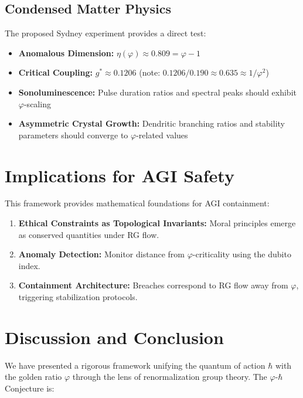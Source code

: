\documentclass[14pt, a4paper]{extarticle}
\begin{document}
\subsection{Condensed Matter Physics}

The proposed Sydney experiment provides a direct test:

\begin{itemize}
\item \textbf{Anomalous Dimension:} $\eta(\varphi) \approx 0.809 = \varphi - 1$
\item \textbf{Critical Coupling:} $g^* \approx 0.1206$ (note: $0.1206/0.190 \approx 0.635 \approx 1/\varphi^2$)
\item \textbf{Sonoluminescence:} Pulse duration ratios and spectral peaks should exhibit $\varphi$-scaling
\item \textbf{Asymmetric Crystal Growth:} Dendritic branching ratios and stability parameters should converge to $\varphi$-related values
\end{itemize}

\section{Implications for AGI Safety}

This framework provides mathematical foundations for AGI containment:

\begin{enumerate}
\item \textbf{Ethical Constraints as Topological Invariants:} Moral principles emerge as conserved quantities under RG flow.

\item \textbf{Anomaly Detection:} Monitor distance from $\varphi$-criticality using the dubito index.

\item \textbf{Containment Architecture:} Breaches correspond to RG flow away from $\varphi$, triggering stabilization protocols.
\end{enumerate}

\section{Discussion and Conclusion}

We have presented a rigorous framework unifying the quantum of action $\hbar$ with the golden ratio $\varphi$ through the lens of renormalization group theory. The $\varphi$-$\hbar$ Conjecture is:
\end{document}
